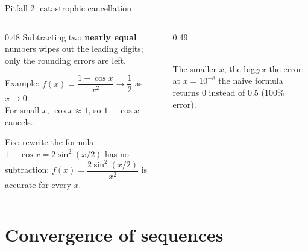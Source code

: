 \documentclass[aspectratio=169]{beamer}
\begin{document}
\begin{frame}{Pitfall 2: catastrophic cancellation}
\begin{columns}[c]
\begin{column}{0.48\textwidth}
\small
Subtracting two \textbf{nearly equal} numbers wipes out the leading digits; only the rounding errors are left.

\vspace{0.2cm}
Example: $f(x) = \dfrac{1-\cos x}{x^2} \to \dfrac12$ as $x \to 0$.\\[4pt]
For small $x$, $\cos x \approx 1$, so $1 - \cos x$ cancels.

\vspace{0.2cm}
\begin{exampleblock}{Fix: rewrite the formula}
$1 - \cos x = 2\sin^2(x/2)$ has no subtraction:
$f(x) = \dfrac{2\sin^2(x/2)}{x^2}$ is accurate for every $x$.
\end{exampleblock}
\end{column}
\begin{column}{0.49\textwidth}
\centering
{}\\[2pt]
\scriptsize The smaller $x$, the bigger the error: at $x = 10^{-8}$ the naive formula returns $0$ instead of $0.5$ (100\% error).
\end{column}
\end{columns}
\end{frame}

\section{Convergence of sequences}
\end{document}
